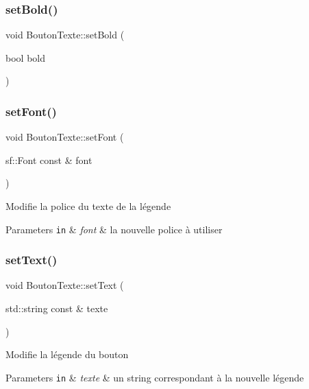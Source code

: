 \subsubsection{\texorpdfstring{set\+Bold()}{setBold()}}
{\footnotesize\ttfamily void Bouton\+Texte\+::set\+Bold (\begin{DoxyParamCaption}\item[{bool}]{bold }\end{DoxyParamCaption})}

\mbox{\label{classBoutonTexte_aa1be3dfb869765c3fb3af4d44d0736ed}} 
\subsubsection{\texorpdfstring{set\+Font()}{setFont()}}
{\footnotesize\ttfamily void Bouton\+Texte\+::set\+Font (\begin{DoxyParamCaption}\item[{sf\+::\+Font const \&}]{font }\end{DoxyParamCaption})}

Modifie la police du texte de la légende 
\begin{DoxyParams}[1]{Parameters}
\mbox{\tt in}  & {\em font} & la nouvelle police à utiliser \\
\hline
\end{DoxyParams}
\mbox{\label{classBoutonTexte_a56d8e807f6bfa767c7e99e86111cb3c5}} 
\subsubsection{\texorpdfstring{set\+Text()}{setText()}\hspace{0.1cm}{\footnotesize\ttfamily [1/2]}}
{\footnotesize\ttfamily void Bouton\+Texte\+::set\+Text (\begin{DoxyParamCaption}\item[{std\+::string const \&}]{texte }\end{DoxyParamCaption})}

Modifie la légende du bouton 
\begin{DoxyParams}[1]{Parameters}
\mbox{\tt in}  & {\em texte} & un string correspondant à la nouvelle légende \\
\hline
\end{DoxyParams}
\mbox{\label{classBoutonTexte_ad0f834397021489f298a7e4f50c2e575}} 
